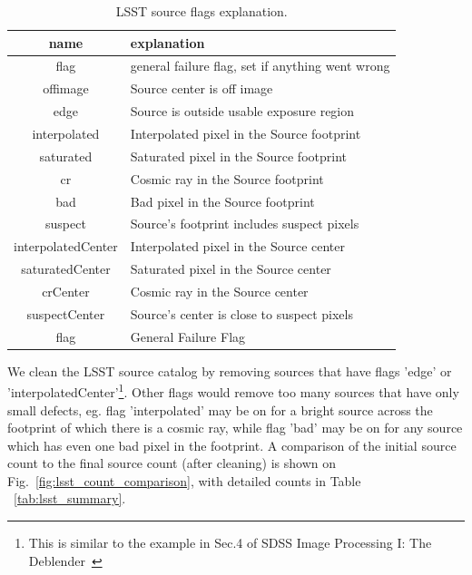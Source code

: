 \documentclass[DM,lsstdraft,toc,usenatbib]{lsstdoc}
\begin{document}
\begin{table}
\centering
\caption{LSST source flags explanation.}
\label{tab:lsst_src_flags}
\begin{tabular}{cl}
\hline
name & explanation \\
\hline
flag & general failure flag, set if anything went wrong \\
offimage & Source center is off image \\
edge & Source is outside usable exposure region  \\
interpolated & Interpolated pixel in the Source footprint \\
saturated & Saturated pixel in the Source footprint \\
cr & Cosmic ray in the Source footprint \\
bad & Bad pixel in the Source footprint \\
suspect & Source's footprint includes suspect pixels \\
interpolatedCenter & Interpolated pixel in the Source center \\
saturatedCenter & Saturated pixel in the Source center \\
crCenter & Cosmic ray in the Source center \\
suspectCenter & Source's center is close to suspect pixels \\
flag & General Failure Flag \\
\hline
\end{tabular}
\end{table}

We clean the LSST source catalog by removing sources that have flags 'edge' or 'interpolatedCenter'\footnote{This is similar to the example in Sec.4 of SDSS Image Processing I: The Deblender~\citep{lupton2005}}. Other flags would remove too many sources that have only small defects, eg. flag 'interpolated' may be on for a bright source across the footprint of which there is a cosmic ray, while flag 'bad' may be on for any source which has even one bad pixel in the footprint. A comparison of the initial source count to the final source count (after cleaning) is shown on Fig.~\ref{fig:lsst_count_comparison}, with detailed counts in  Table ~\ref{tab:lsst_summary}.
\end{document}
